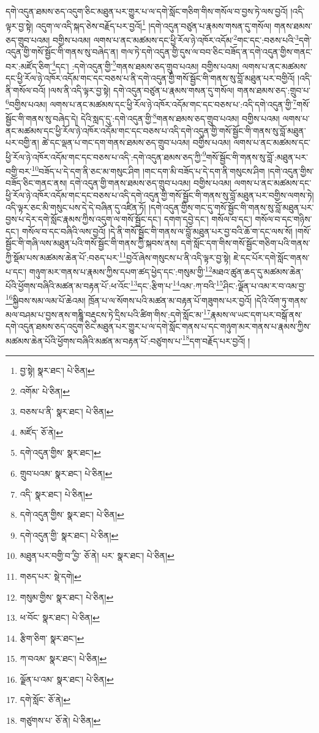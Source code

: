 དགེ་འདུན་ཐམས་ཅད་འདུག་ཅིང་མཐུན་པར་གྱུར་པ་ལ་དགེ་སློང་གཅིག་གིས་གསོལ་བ་བྱས་ཏེ་ལས་བྱའོ། །འདི་ལྟར་བྱ་སྟེ། འདུག་ལ་འདི་སྐད་ཅེས་བརྗོད་པར་བྱའོ།\footnote{བྱ་སྟེ།  སྣར་ཐང་།  པེ་ཅིན། } །དགེ་འདུན་བཙུན་པ་རྣམས་གསན་དུ་གསོལ། གནས་ཐམས་ཅད་གྲུབ་པའམ། བགྱིས་པའམ། ལགས་པ་ནང་མཚམས་དང་ཕྱི་རོལ་ཉེ་འཁོར་འདོམ་\footnote{འགོམ་  པེ་ཅིན། }གང་དང་:བཅས་པའི་\footnote{བཅས་པ་ནི་  སྣར་ཐང་།  པེ་ཅིན། }དགེ་འདུན་གྱི་གསོ་སྦྱོང་གི་གནས་སུ་བཞེད་ན། གལ་ཏེ་དགེ་འདུན་གྱི་དུས་ལ་བབ་ཅིང་བཟོད་ན་དགེ་འདུན་གྱིས་གནང་བར་:མཛོད་ཅིག་\footnote{མཛོད་  ཅོ་ནེ། }དང་། :དགེ་འདུན་གྱི་\footnote{དགེ་འདུན་གྱིས་  སྣར་ཐང་། }གནས་ཐམས་ཅད་གྲུབ་པའམ། བགྱིས་པའམ། ལགས་པ་ནང་མཚམས་དང་ཕྱི་རོལ་ཉེ་འཁོར་འདོམ་གང་དང་བཅས་པ་ནི་དགེ་འདུན་གྱི་གསོ་སྦྱོང་གི་གནས་སུ་བློ་མཐུན་པར་བགྱིའོ། །འདི་ནི་གསོལ་བའོ། །ལས་ནི་འདི་ལྟར་བྱ་སྟེ། དགེ་འདུན་བཙུན་པ་རྣམས་གསན་དུ་གསོལ། གནས་ཐམས་ཅད་:གྲུབ་པ་\footnote{གྲུབ་པའམ་  སྣར་ཐང་།  པེ་ཅིན། }བགྱིས་པའམ། ལགས་པ་ནང་མཚམས་དང་ཕྱི་རོལ་ཉེ་འཁོར་འདོམ་གང་དང་བཅས་པ་:འདི་དགེ་འདུན་གྱི་\footnote{འདི་  སྣར་ཐང་།  པེ་ཅིན། }གསོ་སྦྱོང་གི་གནས་སུ་བཞེད་དེ། དེའི་སླད་དུ་:དགེ་འདུན་གྱི་\footnote{དགེ་འདུན་གྱིས་  སྣར་ཐང་།  པེ་ཅིན། }གནས་ཐམས་ཅད་གྲུབ་པའམ། བགྱིས་པའམ། ལགས་པ་ནང་མཚམས་དང་ཕྱི་རོལ་ཉེ་འཁོར་འདོམ་གང་དང་བཅས་པ་འདི་དགེ་འདུན་གྱི་གསོ་སྦྱོང་གི་གནས་སུ་བློ་མཐུན་པར་བགྱི་ན། ཚེ་དང་ལྡན་པ་གང་དག་གནས་ཐམས་ཅད་གྲུབ་པའམ། བགྱིས་པའམ། ལགས་པ་ནང་མཚམས་དང་ཕྱི་རོལ་ཉེ་འཁོར་འདོམ་གང་དང་བཅས་པ་འདི་:དགེ་འདུན་ཐམས་ཅད་ཀྱི་\footnote{དགེ་འདུན་གྱི་  སྣར་ཐང་།  པེ་ཅིན། }གསོ་སྦྱོང་གི་གནས་སུ་བློ་:མཐུན་པར་བགྱི་བར་\footnote{མཐུན་པར་བགྱི་བ་ྱི་བ་  ཅོ་ནེ། པར་  སྣར་ཐང་།  པེ་ཅིན། }བཟོད་པ་དེ་དག་ནི་ཅང་མ་གསུང་ཤིག །གང་དག་མི་བཟོད་པ་དེ་དག་ནི་གསུངས་ཤིག །དགེ་འདུན་གྱིས་བཟོད་ཅིང་གནང་ནས། དགེ་འདུན་གྱི་གནས་ཐམས་ཅད་གྲུབ་པའམ། བགྱིས་པའམ། ལགས་པ་ནང་མཚམས་དང་ཕྱི་རོལ་ཉེ་འཁོར་འདོམ་གང་དང་བཅས་པ་འདི་དགེ་འདུན་གྱི་གསོ་སྦྱོང་གི་གནས་སུ་བློ་མཐུན་པར་བགྱིས་ལགས་ཏེ། འདི་ལྟར་ཅང་མི་གསུང་པས་དེ་དེ་བཞིན་དུ་འཛིན་ཏོ། །དགེ་འདུན་གྱིས་གང་དུ་གསོ་སྦྱོང་གི་གནས་སུ་བློ་མཐུན་པར་བྱས་པ་དེར་དགེ་སློང་རྣམས་ཀྱིས་འདུག་ལ་གསོ་སྦྱོང་དང་། དགག་དབྱེ་དང་། གསོལ་བ་དང་། གསོལ་བ་དང་གཉིས་དང་། གསོལ་བ་དང་བཞིའི་ལས་བྱའོ། །དེ་ནི་གསོ་སྦྱོང་གི་གནས་ལ་བློ་མཐུན་པར་བྱ་བའི་ཆོ་ག་དང་ལས་སོ། །གསོ་སྦྱོང་གི་གཞི་ལས་མཐུན་པའི་གསོ་སྦྱོང་གི་གནས་ཀྱི་སྐབས་ནས། དགེ་སློང་དག་གིས་གསོ་སྦྱོང་གཅིག་པའི་གནས་ཀྱི་སྡོམ་པས་མཚམས་ཆེན་པོ་:བཅད་པར་\footnote{གཅད་པར་  སྡེ་དགེ། }བྱའོ་ཞེས་གསུངས་པ་ནི་འདི་ལྟར་བྱ་སྟེ། ཇེ་དང་པོར་དགེ་སློང་གནས་པ་དང་། གཉུག་མར་གནས་པ་རྣམས་ཀྱིས་དཔག་ཚད་ཕྱེད་དང་:གསུམ་གྱི་\footnote{གསུམ་གྱིས་  སྣར་ཐང་།  པེ་ཅིན། }མཐའ་ཚུན་ཆད་དུ་མཚམས་ཆེན་པོའི་ཕྱོགས་བཞིའི་མཚན་མ་བརྟན་པོ་:ཕ་འོང་\footnote{ཕ་བོང་  སྣར་ཐང་།  པེ་ཅིན། }དང་:རྩིག་པ་\footnote{རྩིག་ཅིག་  སྣར་ཐང་། }འམ་:ཀ་བའི་\footnote{ཀ་བའམ་  སྣར་ཐང་།  པེ་ཅིན། }ཤིང་:ལྗོན་པ་འམ་ར་བ་འམ་བྱ་\footnote{ལྗོན་པ་འམ་  སྣར་ཐང་།  པེ་ཅིན། }སྐྱིབས་སམ་ལམ་པོ་ཆེའམ། ཁྲོན་པ་ལ་སོགས་པའི་མཚན་མ་བརྟན་པོ་གཟུགས་པར་བྱའོ། །དེའི་འོག་ཏུ་གནས་མལ་བཤམ་པ་བྱས་ནས་གཎྜཱི་བརྡུངས་ཏེ་དྲིས་པའི་ཚིག་གིས་:དགེ་སློང་མ་\footnote{དགེ་སློང་  ཅོ་ནེ། }རྣམས་ལ་ཡང་དག་པར་བསྒོ་ནས་དགེ་འདུན་ཐམས་ཅད་འདུག་ཅིང་མཐུན་པར་གྱུར་པ་ལ་དགེ་སློང་གནས་པ་དང་གཉུག་མར་གནས་པ་རྣམས་ཀྱིས་མཚམས་ཆེན་པོའི་ཕྱོགས་བཞིའི་མཚན་མ་བརྟན་པོ་:བཙུགས་པ་\footnote{གཙུགས་པ་  ཅོ་ནེ།  པེ་ཅིན། }དག་བརྗོད་པར་བྱའོ། །
